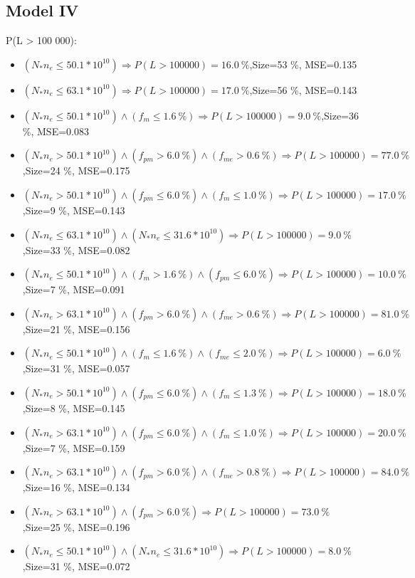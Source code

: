 \documentclass[numbered]{CSL}
\begin{document}
\subsection{Model IV}
P(L > 100 000):
\begin{itemize}
\item $(N_* n_e \leq 50.1 * 10^{10}) \Rightarrow P(L > 100 000) = 16.0~\%$,\hfill Size=53 \%, MSE=0.135
\item $(N_* n_e \leq 63.1 * 10^{10}) \Rightarrow P(L > 100 000) = 17.0~\%$,\hfill Size=56 \%, MSE=0.143
\item $(N_* n_e \leq 50.1 * 10^{10}) \land (f_m \leq 1.6~\%) \Rightarrow P(L > 100 000) = 9.0~\%$,\hfill Size=36 \%, MSE=0.083
\item $(N_* n_e > 50.1 * 10^{10}) \land (f_{pm} > 6.0~\%) \land (f_{me} > 0.6~\%) \Rightarrow P(L > 100 000) = 77.0~\%$,\hfill Size=24 \%, MSE=0.175
\item $(N_* n_e > 50.1 * 10^{10}) \land (f_{pm} \leq 6.0~\%) \land (f_m \leq 1.0~\%) \Rightarrow P(L > 100 000) = 17.0~\%$,\hfill Size=9 \%, MSE=0.143
\item $(N_* n_e \leq 63.1 * 10^{10}) \land (N_* n_e \leq 31.6 * 10^{10}) \Rightarrow P(L > 100 000) = 9.0~\%$,\hfill Size=33 \%, MSE=0.082
\item $(N_* n_e \leq 50.1 * 10^{10}) \land (f_m > 1.6~\%) \land (f_{pm} \leq 6.0~\%) \Rightarrow P(L > 100 000) = 10.0~\%$,\hfill Size=7 \%, MSE=0.091
\item $(N_* n_e > 63.1 * 10^{10}) \land (f_{pm} > 6.0~\%) \land (f_{me} > 0.6~\%) \Rightarrow P(L > 100 000) = 81.0~\%$,\hfill Size=21 \%, MSE=0.156
\item $(N_* n_e \leq 50.1 * 10^{10}) \land (f_m \leq 1.6~\%) \land (f_{me} \leq 2.0~\%) \Rightarrow P(L > 100 000) = 6.0~\%$,\hfill Size=31 \%, MSE=0.057
\item $(N_* n_e > 50.1 * 10^{10}) \land (f_{pm} \leq 6.0~\%) \land (f_m \leq 1.3~\%) \Rightarrow P(L > 100 000) = 18.0~\%$,\hfill Size=8 \%, MSE=0.145
\item $(N_* n_e > 63.1 * 10^{10}) \land (f_{pm} \leq 6.0~\%) \land (f_m \leq 1.0~\%) \Rightarrow P(L > 100 000) = 20.0~\%$,\hfill Size=7 \%, MSE=0.159
\item $(N_* n_e > 63.1 * 10^{10}) \land (f_{pm} > 6.0~\%) \land (f_{me} > 0.8~\%) \Rightarrow P(L > 100 000) = 84.0~\%$,\hfill Size=16 \%, MSE=0.134
\item $(N_* n_e > 63.1 * 10^{10}) \land (f_{pm} > 6.0~\%) \Rightarrow P(L > 100 000) = 73.0~\%$,\hfill Size=25 \%, MSE=0.196
\item $(N_* n_e \leq 50.1 * 10^{10}) \land (N_* n_e \leq 31.6 * 10^{10}) \Rightarrow P(L > 100 000) = 8.0~\%$,\hfill Size=31 \%, MSE=0.072

\end{itemize}
\end{document}
